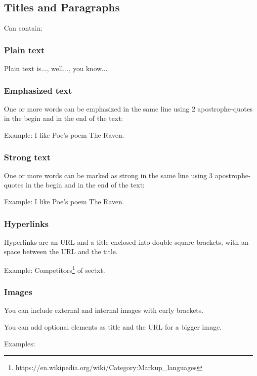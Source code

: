 \documentclass[a4paper,11pt]{article}
\begin{document}
\subsection{Titles and Paragraphs }
Can contain:

\subsubsection{Plain text}
Plain text is..., well..., you know...

\subsubsection{Emphasized text}
One or more words can be emphasized in the same line using 2 
apostrophe-quotes in the begin and in the end of the text:

Example: I like Poe's poem The Raven.

\subsubsection{Strong text}
One or more words can be marked as strong in the same line 
using 3 apostrophe-quotes in the begin and in the end of the text:

Example: I like Poe's poem The Raven.

\subsubsection{Hyperlinks}
Hyperlinks are an URL and a title enclosed into double square
brackets, with an space between the URL and the title.

Example: Competitors\footnote{https://en.wikipedia.org/wiki/Category:Markup_languages} of sectxt.

\subsubsection{Images}
You can include external and internal images with curly brackets.	

You can add optional elements as title and the URL for a bigger image.

Examples: 
\end{document}
